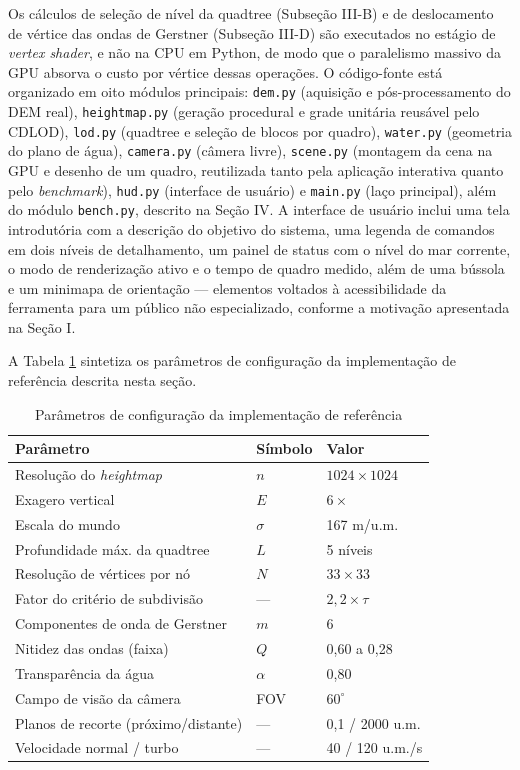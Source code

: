 \documentclass[conference]{IEEEtran}
\begin{document}
Os cálculos de seleção de nível da quadtree (Subseção III-B) e de
deslocamento de vértice das ondas de Gerstner (Subseção III-D) são
executados no estágio de \emph{vertex shader}, e não na CPU em Python, de
modo que o paralelismo massivo da GPU absorva o custo por vértice dessas
operações. O código-fonte está organizado em oito módulos principais:
\texttt{dem.py} (aquisição e pós-processamento do DEM real),
\texttt{heightmap.py} (geração procedural e grade unitária reusável pelo
CDLOD), \texttt{lod.py} (quadtree e seleção de blocos por quadro),
\texttt{water.py} (geometria do plano de água), \texttt{camera.py}
(câmera livre), \texttt{scene.py} (montagem da cena na GPU e desenho de
um quadro, reutilizada tanto pela aplicação interativa quanto pelo
\emph{benchmark}), \texttt{hud.py} (interface de usuário) e
\texttt{main.py} (laço principal), além do módulo \texttt{bench.py},
descrito na Seção IV. A interface de usuário inclui uma tela introdutória
com a descrição do objetivo do sistema, uma legenda de comandos em dois
níveis de detalhamento, um painel de status com o nível do mar corrente,
o modo de renderização ativo e o tempo de quadro medido, além de uma
bússola e um minimapa de orientação --- elementos voltados à
acessibilidade da ferramenta para um público não especializado, conforme
a motivação apresentada na Seção I.

A Tabela \ref{tab:parametros} sintetiza os parâmetros de configuração da
implementação de referência descrita nesta seção.

\begin{table}[t]
\caption{Parâmetros de configuração da implementação de referência}
\label{tab:parametros}
\centering
\begin{tabular}{@{}p{3.1cm}p{0.9cm}p{2.4cm}@{}}
\toprule
\textbf{Parâmetro} & \textbf{Símbolo} & \textbf{Valor} \\
\midrule
Resolução do \emph{heightmap} & $n$ & $1024 \times 1024$ \\
Exagero vertical & $E$ & $6\times$ \\
Escala do mundo & $\sigma$ & 167 m/u.m. \\
Profundidade máx. da quadtree & $L$ & 5 níveis \\
Resolução de vértices por nó & $N$ & $33 \times 33$ \\
Fator do critério de subdivisão & --- & $2{,}2 \times \tau$ \\
Componentes de onda de Gerstner & $m$ & 6 \\
Nitidez das ondas (faixa) & $Q$ & 0,60 a 0,28 \\
Transparência da água & $\alpha$ & 0,80 \\
Campo de visão da câmera & FOV & $60^{\circ}$ \\
Planos de recorte (próximo/distante) & --- & 0,1 / 2000 u.m. \\
Velocidade normal / turbo & --- & 40 / 120 u.m./s \\
\bottomrule
\end{tabular}
\end{table}
\end{document}
